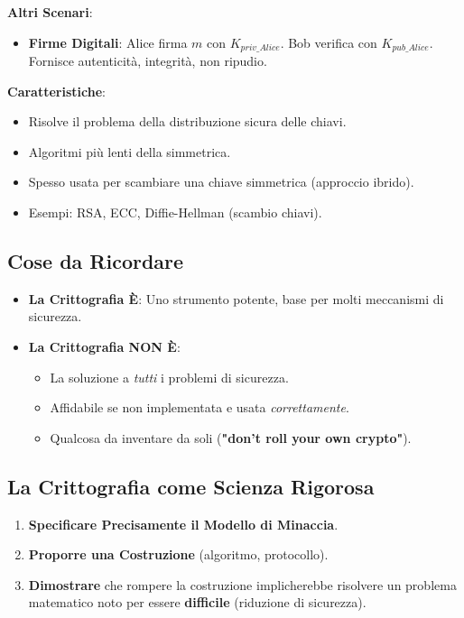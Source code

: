 \documentclass{article}
\begin{document}
\textbf{Altri Scenari}:
\begin{itemize}
    \item \textbf{Firme Digitali}: Alice firma $m$ con $K_{priv\_Alice}$. Bob verifica con $K_{pub\_Alice}$. Fornisce autenticità, integrità, non ripudio.
\end{itemize}
\textbf{Caratteristiche}:
\begin{itemize}
    \item Risolve il problema della distribuzione sicura delle chiavi.
    \item Algoritmi più lenti della simmetrica.
    \item Spesso usata per scambiare una chiave simmetrica (approccio ibrido).
    \item Esempi: RSA, ECC, Diffie-Hellman (scambio chiavi).
\end{itemize}

\subsection{Cose da Ricordare}
\begin{itemize}
    \item \textbf{La Crittografia È}: Uno strumento potente, base per molti meccanismi di sicurezza.
    \item \textbf{La Crittografia NON È}:
    \begin{itemize}
        \item La soluzione a \textit{tutti} i problemi di sicurezza.
        \item Affidabile se non implementata e usata \textit{correttamente}.
        \item Qualcosa da inventare da soli (\textbf{"don't roll your own crypto"}).
    \end{itemize}
\end{itemize}

\subsection{La Crittografia come Scienza Rigorosa}
\begin{enumerate}
    \item \textbf{Specificare Precisamente il Modello di Minaccia}.
    \item \textbf{Proporre una Costruzione} (algoritmo, protocollo).
    \item \textbf{Dimostrare} che rompere la costruzione implicherebbe risolvere un problema matematico noto per essere \textbf{difficile} (riduzione di sicurezza).
\end{enumerate}
\end{document}
